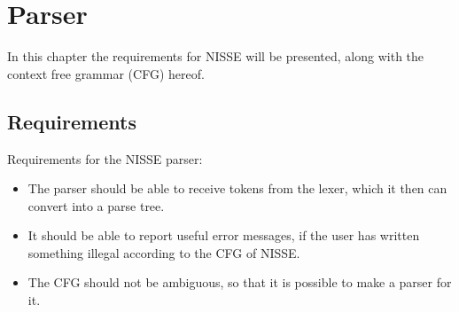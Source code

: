 \chapter{Parser}

In this chapter the requirements for NISSE will be presented, along with the context free grammar (CFG) hereof.

\section{Requirements}
Requirements for the NISSE parser:
\begin{itemize}
	\item The parser should be able to receive tokens from the lexer, which it then can convert into a parse tree.
	\item It should be able to report useful error messages, if the user has written something illegal according to the CFG of NISSE.
	\item The CFG should not be ambiguous, so that it is possible to make a parser for it. 
\end{itemize}

\newpage
